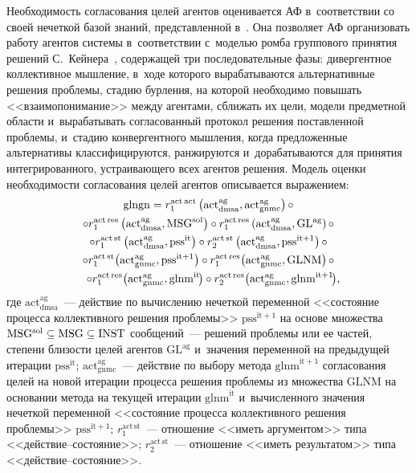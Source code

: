 \begin{multicols}{2}
  Необходимость согласования целей агентов оценивается АФ в~соответствии 
со своей нечеткой базой знаний, представленной в~\cite{12-kir}. Она позволяет 
АФ организовать работу агентов системы в~соответствии с~моделью ромба 
группового принятия решений С.~Кейнера~\cite{13-kir}, содержащей три 
последовательные фазы: дивергентное коллективное мышление, в~ходе 
которого вырабатываются альтернативные решения проб\-ле\-мы, стадию 
бурления, на которой необходимо повышать <<взаимопонимание>> между 
агентами, сближать их цели, модели предметной об\-ласти и~вырабатывать 
согласованный протокол решения поставленной проб\-ле\-мы,\linebreak
 и~стадию 
конвергентного мышления, когда предложенные альтернативы 
классифицируются, ранжируются и~дорабатываются для принятия 
интегрированного, устраивающего всех агентов \mbox{решения}. Модель оценки 
необходимости согласования целей агентов описывается выражением:
  \begin{multline*}
  \mathrm{glngn}=r_1^{\mathrm{act\,act}}\left(\mathrm{act^{ag}_{dmsa}}, 
\mathrm{act^{ag}_{gnmc}}\right)\circ \\
\circ
r_1^{\mathrm{act\,res}}\left(\mathrm{act^{ag}_{dmsa}}, 
\mathrm{MSG^{sol}}\right)\circ 
r_1^{\mathrm{act\,res}}\left(\mathrm{act^{ag}_{dmsa}}, 
\mathrm{GL^{ag}}\right)\circ\\
  \circ r_1^{\mathrm{act\,st}} \left(\mathrm{act^{ag}_{dmsa}}, \mathrm{pss}^{\mathrm{it}}\right)\circ 
r_2^{\mathrm{act\,st}}\left(\mathrm{act^{ag}_{dmsa}}, \mathrm{pss}^{\mathrm{it}+1}\right)\circ \\
\circ
r_1^{\mathrm{act\,st}}\!\left(\mathrm{act^{ag}_{gnmc}}, \mathrm{pss}^{\mathrm{it}+1}\right)\circ
 r_1^{\mathrm{act\,res}}\!\left(\mathrm{act^{ag}_{gnmc}}, 
\mathrm{GLNM}\right) \circ\\
\circ
 r_1^{\mathrm{act\,res}} \!
\left(\mathrm{act^{ag}_{gnmc}}, \mathrm{glnm}^{\mathrm{it}}\!\right)\circ 
r_2^{\mathrm{act\,res}}\!\left(\mathrm{act^{ag}_{gnmc}}, 
\mathrm{glnm}^{\mathrm{it}+1}\!\right)\!,\hspace*{-8.67668pt}
  \end{multline*}
где $\mathrm{act^{ag}_{dmsa}}$~--- действие по вычислению нечеткой 
переменной <<состояние процесса коллективного решения проблемы>> 
$\mathrm{pss}^{\mathrm{it}+1}$ на основе множества $\mathrm{MSG^{sol}}\hm\subseteq 
\mathrm{MSG} \hm\subseteq \mathrm{INST}$ сообщений~--- решений 
проблемы или ее частей, степени близости целей агентов $\mathrm{GL^{ag}}$ 
и~значения переменной на предыду\-щей итерации $\mathrm{pss}^{\mathrm{it}}$; 
$\mathrm{act^{ag}_{gnmc}}$~--- действие по выбору метода 
$\mathrm{glnm}^{\mathrm{it}+1}$ согласования целей на новой итерации процесса 
решения проблемы из множества $\mathrm{GLNM}$ на основании метода на 
текущей итерации $\mathrm{glnm}^{\mathrm{it}}$ и~вычисленного значения нечеткой 
переменной <<со\-сто\-яние процесса коллективного решения проб\-ле\-мы>> 
$\mathrm{pss}^{\mathrm{it}+1}$; $r_1^{\mathrm{act\,st}}$~--- отношение <<иметь аргументом>> 
типа <<дей\-ст\-вие--со\-сто\-яние>>; $r_2^{\mathrm{act\,st}}$~--- отношение 
<<иметь результатом>> типа <<дей\-ст\-вие--со\-сто\-яние>>.
  

\end{multicols}

